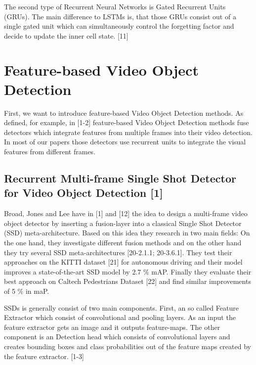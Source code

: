 \documentclass[conference]{IEEEtran}
\begin{document}
The second type of Recurrent Neural Networks is Gated Recurrent Units (GRUs). The main difference to LSTMs is, that those GRUs consist out of a single gated unit which can simultaneously control the forgetting factor and decide to update the inner cell state. [11]

\section{Feature-based Video Object Detection}

First, we want to introduce feature-based Video Object Detection methods. As defined, for example, in [1-2] feature-based Video Object Detection methods fuse detectors which integrate features from multiple frames into their video detection. In most of our papers those detectors use recurrent units to integrate the visual features from different frames.  

\subsection{Recurrent Multi-frame Single Shot Detector for Video Object Detection [1]}
Broad, Jones and Lee have in [1] and [12] the idea to design a multi-frame video object detector by inserting a fusion-layer into a classical Single Shot Detector (SSD) meta-architecture. Based on this idea they research in two main fields: On the one hand, they investigate different fusion methods and on the other hand they try several SSD meta-architectures [20-2.1.1; 20-3.6.1]. They test their approaches on the KITTI dataset [21] for autonomous driving and their model improves a state-of-the-art SSD model by 2.7 \% mAP. Finally they evaluate their best approach on Caltech Pedestrians Dataset [22] and find similar improvements of 5 \% in maP.   \newline

SSDs is generally consist of two main components. First, an so called Feature Extractor which consist of convolutional and pooling layers. As an input the feature extractor gets an image and it outputs feature-maps. The other component is an Detection head which consists of convolutional layers and creates bounding boxes and class probabilities out of the feature maps created by the feature extractor. [1-3] \newline
\end{document}
